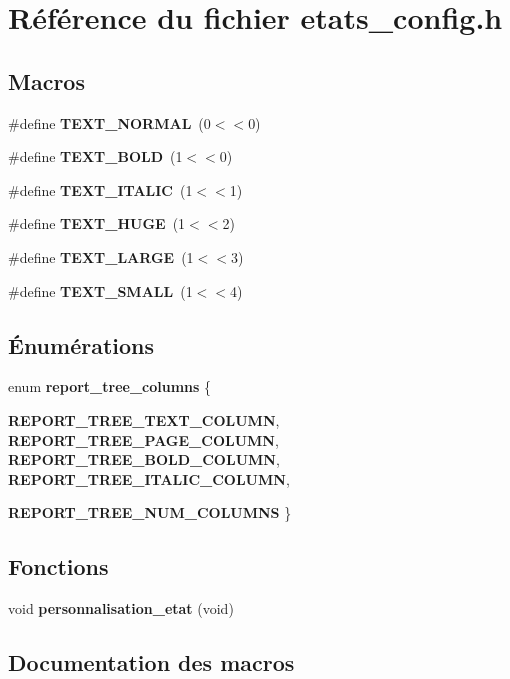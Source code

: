 \section{Référence du fichier etats\_\-config.h}
\label{etats__config_8h}
\subsection*{Macros}
\begin{DoxyCompactItemize}
\item 
\#define {\bf TEXT\_\-NORMAL}~(0$<$$<$0)
\item 
\#define {\bf TEXT\_\-BOLD}~(1$<$$<$0)
\item 
\#define {\bf TEXT\_\-ITALIC}~(1$<$$<$1)
\item 
\#define {\bf TEXT\_\-HUGE}~(1$<$$<$2)
\item 
\#define {\bf TEXT\_\-LARGE}~(1$<$$<$3)
\item 
\#define {\bf TEXT\_\-SMALL}~(1$<$$<$4)
\end{DoxyCompactItemize}
\subsection*{Énumérations}
\begin{DoxyCompactItemize}
\item 
enum {\bf report\_\-tree\_\-columns} \{ \par
{\bf REPORT\_\-TREE\_\-TEXT\_\-COLUMN}, 
{\bf REPORT\_\-TREE\_\-PAGE\_\-COLUMN}, 
{\bf REPORT\_\-TREE\_\-BOLD\_\-COLUMN}, 
{\bf REPORT\_\-TREE\_\-ITALIC\_\-COLUMN}, 
\par
{\bf REPORT\_\-TREE\_\-NUM\_\-COLUMNS}
 \}
\end{DoxyCompactItemize}
\subsection*{Fonctions}
\begin{DoxyCompactItemize}
\item 
void {\bf personnalisation\_\-etat} (void)
\end{DoxyCompactItemize}


\subsection{Documentation des macros}
